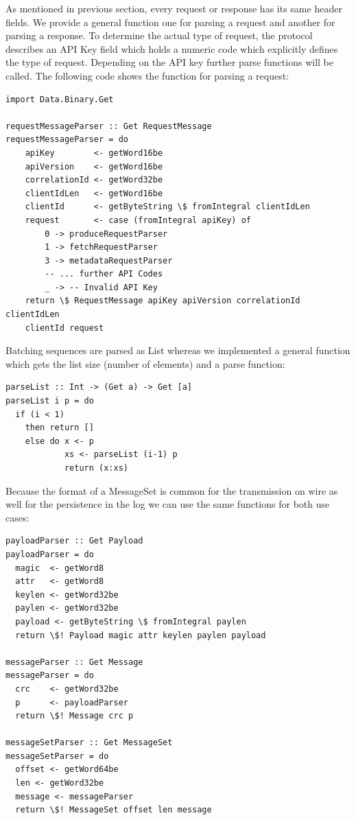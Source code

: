 As mentioned in previous section, every request or response has its same header
fields. We provide a general function one for parsing a request and another for
parsing a response. To determine the actual type of request, the protocol describes
an API Key field which holds a numeric code which explicitly defines the type of
request. Depending on the API key further parse functions will be called. The
following code shows the function for parsing a request: 
\begin{lstlisting}
import Data.Binary.Get

requestMessageParser :: Get RequestMessage 
requestMessageParser = do 
    apiKey        <- getWord16be
    apiVersion    <- getWord16be
    correlationId <- getWord32be
    clientIdLen   <- getWord16be
    clientId      <- getByteString \$ fromIntegral clientIdLen
    request       <- case (fromIntegral apiKey) of
        0 -> produceRequestParser
        1 -> fetchRequestParser
        3 -> metadataRequestParser
        -- ... further API Codes 
        _ -> -- Invalid API Key 
    return \$ RequestMessage apiKey apiVersion correlationId clientIdLen
    clientId request
\end{lstlisting}

Batching sequences are parsed as List whereas we implemented a general function
which gets the list size (number of elements) and a parse function: 
\begin{lstlisting}
parseList :: Int -> (Get a) -> Get [a]
parseList i p = do 
  if (i < 1) 
    then return []
    else do x <- p
            xs <- parseList (i-1) p
            return (x:xs)
\end{lstlisting}

Because the format of a MessageSet is common for the transmission on wire as
well for the persistence in the log we can use the same functions for both use cases:
\begin{lstlisting}
payloadParser :: Get Payload
payloadParser = do
  magic  <- getWord8
  attr   <- getWord8
  keylen <- getWord32be
  paylen <- getWord32be
  payload <- getByteString \$ fromIntegral paylen
  return \$! Payload magic attr keylen paylen payload

messageParser :: Get Message 
messageParser = do 
  crc    <- getWord32be
  p      <- payloadParser
  return \$! Message crc p

messageSetParser :: Get MessageSet 
messageSetParser = do 
  offset <- getWord64be
  len <- getWord32be 
  message <- messageParser
  return \$! MessageSet offset len message
\end{lstlisting}

